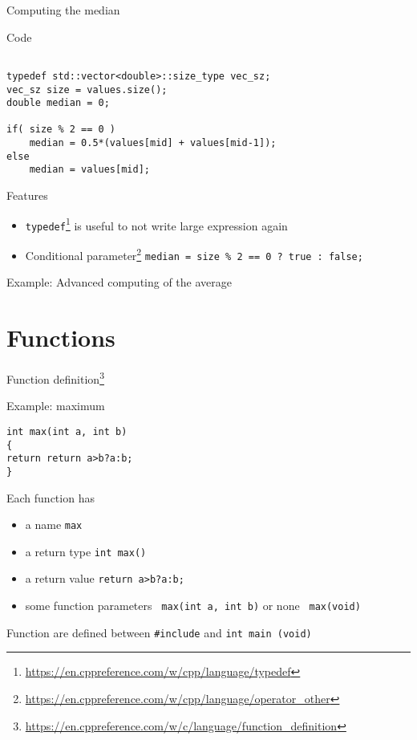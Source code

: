 \documentclass[12pt]{beamer}
\begin{document}
\begin{frame}[fragile]{Computing the median}

\begin{block}{Code}
\begin{lstlisting}

typedef std::vector<double>::size_type vec_sz;
vec_sz size = values.size();
double median = 0;

if( size % 2 == 0 ) 
	median = 0.5*(values[mid] + values[mid-1]);
else
	median = values[mid];
\end{lstlisting}
\end{block}

\begin{block}{Features}
\begin{itemize}
\item \lstinline|typedef|\footnote{\tiny\url{https://en.cppreference.com/w/cpp/language/typedef}} is useful to not write large expression again
\item Conditional parameter\footnote{\tiny\url{https://en.cppreference.com/w/cpp/language/operator_other}} \lstinline|median = size % 2 == 0 ? true : false; |
\end{itemize}
\end{block}
\end{frame}

\begin{frame}{Example: Advanced computing of the average}



\end{frame}

\section{Functions}

\begin{frame}[fragile]{Function definition\footnote{\tiny\url{https://en.cppreference.com/w/c/language/function_definition}}}

\begin{block}{Example: maximum}
\begin{lstlisting}
int max(int a, int b)
{
return return a>b?a:b;
}

\end{lstlisting}
\end{block}
\begin{block}{Each function has}
\begin{itemize}
\item a name \lstinline|max|
\item a return type \lstinline|int max()|
\item a return value \lstinline|return a>b?a:b;|
\item some function parameters \lstinline| max(int a, int b)| or none \lstinline| max(void) |
\end{itemize}
\end{block}
Function are defined between \lstinline|#include| and \lstinline|int main (void)|
\end{frame}
\end{document}
